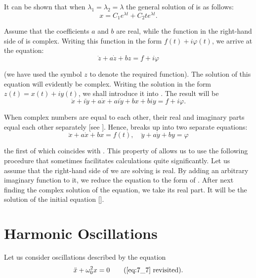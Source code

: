 \noindent
It can be shown that when $\lambda_1=\lambda_2=\lambda$ the general solution of  is as follows:
\begin{equation}\label{eq:7_46}
	x = C_1 e^{\lambda t} + C_2 t e^{\lambda t}.
\end{equation}

Assume that the coefficients $a$ and $b$ are real, while the function in the right-hand side of  is complex. Writing this function in the form $f(t)+i\varphi(t)$, we arrive at the equation:
\begin{equation}\label{eq:7_47}
	\ddot{z} + a\dot{z} + bz = f + i\varphi
\end{equation}

\noindent
(we have used the symbol $z$ to denote the required function). The solution of this equation will evidently be complex. Writing the solution in the form $z(t)=x(t)+iy(t)$, we shall introduce it into . The result will be
\begin{equation}\label{eq:7_48}
	\ddot{x} + i\ddot{y} + a\dot{x} + ai\dot{y} + bx + biy = f + i\varphi.
\end{equation}

\noindent
When complex numbers are equal to each other, their real and imaginary parts equal each other separately [see ]. Hence,  breaks up into two separate equations:
\begin{equation}\label{eq:7_49}
	\ddot{x} + a\dot{x} + bx = f(t),\quad \ddot{y} + a\dot{y} + by = \varphi
\end{equation}

\noindent
the first of which coincides with . This property of  allows us to use the following procedure that sometimes facilitates calculations quite significantly. Let us assume that the right-hand side of  we are solving is real. By adding an arbitrary imaginary function to it, we reduce the equation to the form of . After next finding the complex solution of the equation, we take its real part. It will be the solution of the initial equation [].

\section{Harmonic Oscillations}\label{sec:7_5}

Let us consider oscillations described by the equation
\begin{equation*}
	\ddot{x} + \omega_0^2 x = 0\tag{\ref{eq:7_7} revisited}.
\end{equation*}

